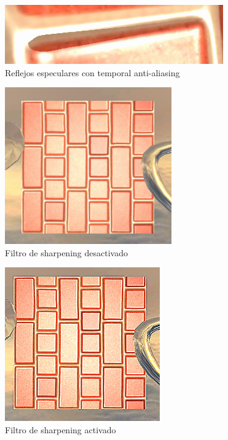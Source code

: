 \documentclass[withindex, glossary]{cam-thesis}
\begin{document}
\begin{figure}[!htbp]
    \includegraphics[width=.8\linewidth]{figures/shadowtaaON.png}
    \caption{Reflejos especulares con temporal anti-aliasing}
    \label{shadowtaaON}
\end{figure}

\begin{figure}[!htbp]
    \includegraphics[width=.8\linewidth]{figures/sharpOFFsmall.png}
    \caption{Filtro de sharpening desactivado}
    \label{sharpOFFsmall}
\end{figure}

\begin{figure}[!htbp]
    \includegraphics[width=.8\linewidth]{figures/sharpONsmall.png}
    \caption{Filtro de sharpening activado}
    \label{sharpOnsmall}
\end{figure}
\end{document}
